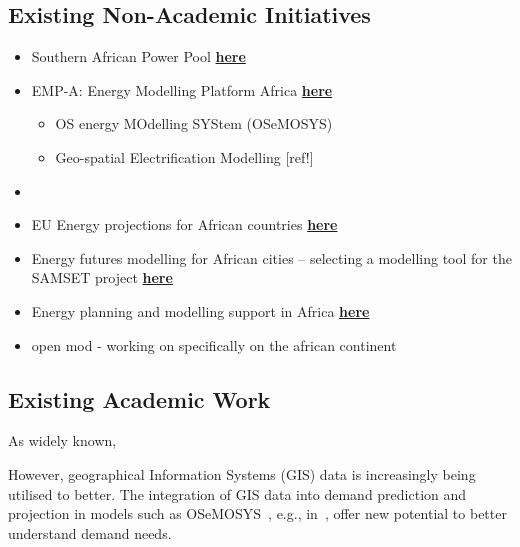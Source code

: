 \documentclass[conference, a4paper]{IEEEtran}
\begin{document}
\subsection{Existing Non-Academic Initiatives}
\begin{itemize}
\item Southern African Power Pool \href{https://globaltransmission.info/archive.php?id=36051}{\textbf{here}}
\item EMP-A: Energy Modelling Platform Africa \href{http://www.energymodellingplatform.org/africa.html}{\textbf{here}}
\begin{itemize}
\item OS energy MOdelling SYStem (OSeMOSYS) \cite{howells-rogner-ea-2011}
\item Geo-spatial Electrification Modelling [ref!]
\end{itemize}
\item 
\item EU Energy projections for African countries \href{https://op.europa.eu/en/publication-detail/-/publication/5bfffb22-fe1d-11e9-8c1f-01aa75ed71a1/language-en}{\textbf{here}}
\item Energy	futures	modelling	for	African	cities	– selecting	a	modelling	tool for the	SAMSET	project  \href{https://media.africaportal.org/documents/14Tait-etal-energy_futures_modelling.pdf}{\textbf{here}}
\item Energy planning and modelling support in Africa \href{{https://irena.org/-/media/Files/IRENA/Planning/IRENA_Modelling_support_Africa_2020.pdf?la=en&hash=C66FD1D23605A4F5065FBA47896EC55060A85B41}}{\textbf{here}}

\item open mod - working on specifically on the african continent

\end{itemize}

\subsection{Existing Academic Work}

As widely known,


 However, geographical Information Systems (GIS) data is increasingly being utilised to better. The integration of GIS data into demand prediction and projection in models such as OSeMOSYS~\cite{howells-rogner-ea-2011}, e.g., in~\cite{rocco-fumagalli-ea-2021}, offer new potential to better understand demand needs.  
\end{document}
